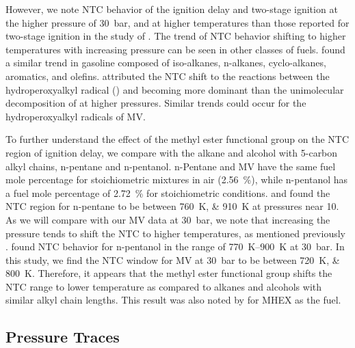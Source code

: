 \documentclass[letterpaper, review]{elsarticle}
\begin{document}
However, we note NTC behavior of the ignition delay and two-stage ignition at the higher pressure of
\SI{30}{\bar}, and at higher temperatures than those reported for two-stage ignition in the study of
\citet{Hadj-Ali2009}. The trend of NTC behavior shifting to higher temperatures with increasing
pressure can be seen in other classes of fuels. \citet{Kukkadapu2012} found a similar trend in
gasoline composed of iso-alkanes, n-alkanes, cyclo-alkanes, aromatics, and olefins.
\citet{Kukkadapu2012} attributed the NTC shift to the reactions between the hydroperoxyalkyl radical
() and  becoming more dominant than the unimolecular decomposition of  at
higher pressures. Similar trends could occur for the hydroperoxyalkyl radicals of MV.

To further understand the effect of the methyl ester functional group on the NTC region of ignition
delay, we compare with the alkane and alcohol with 5-carbon alkyl chains, n-pentane and n-pentanol.
n-Pentane and MV have the same fuel mole percentage for stoichiometric mixtures in air
(\SI{2.56}{\percent}), while n-pentanol has a fuel mole percentage of \SI{2.72}{\percent} for
stoichiometric conditions. \citet{Ribaucour1998} and \citet{Bugler2015} found the NTC region for
n-pentane to be between \SIlist{760;910}{\K} at pressures near \SI{10}{\atm}. As we will compare
with our MV data at \SI{30}{\bar}, we note that increasing the pressure tends to shift the NTC
to higher temperatures, as mentioned previously \cite{Kukkadapu2012}. \citet{Heufer2013} found NTC
behavior for n-pentanol in the range of \SIrange{770}{900}{\K} at \SI{30}{\bar}. In this study, we
find the NTC window for MV at \SI{30}{\bar} to be between \SIlist{720;800}{\K}. Therefore, it
appears that the methyl ester functional group shifts the NTC range to lower temperature as compared
to alkanes and alcohols with similar alkyl chain lengths. This result was also noted by
\citet{Hadj-Ali2009} for MHEX as the fuel.

\subsection{Pressure Traces}\label{sec:pressure-traces}
\end{document}
